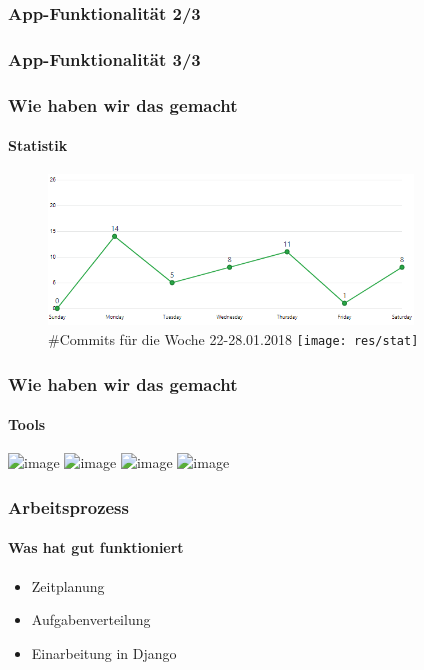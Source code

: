 \documentclass{beamer}
\begin{document}
\begin{frame}
\frametitle{App-Funktionalität 2/3}
\begin{center}

\end{center}\end{frame}
\begin{frame}
\frametitle{App-Funktionalität 3/3}
\begin{center}

\end{center}\end{frame}
\begin{frame}

\frametitle{Wie haben wir das gemacht}
\framesubtitle{Statistik}
\begin{figure}
	
\includegraphics[width=.8\textwidth, height = 4cm]{res/git_stat}\newline \vspace{0.3cm}
\#Commits für die Woche 22-28.01.2018
\texttt{[image: res/stat]}
\end{figure}

\end{frame}
\begin{frame}
\frametitle{Wie haben wir das gemacht}
\framesubtitle{Tools}
\includegraphics<1>[width=6.7cm, height=3.2cm]{res/tools1}
\includegraphics<2>[width=\textwidth]{res/tools2}
\includegraphics<3>[width=\textwidth]{res/tools3}
\includegraphics<4>[width=\textwidth]{res/tools4}
\end{frame}
\begin{frame}
\frametitle{Arbeitsprozess}
\framesubtitle{Was hat gut funktioniert}
\begin{itemize}
	\item<1-3> Zeitplanung
	\item<2-3> Aufgabenverteilung
	\item<3> Einarbeitung in Django
\end{itemize}
\end{frame}
\end{document}

